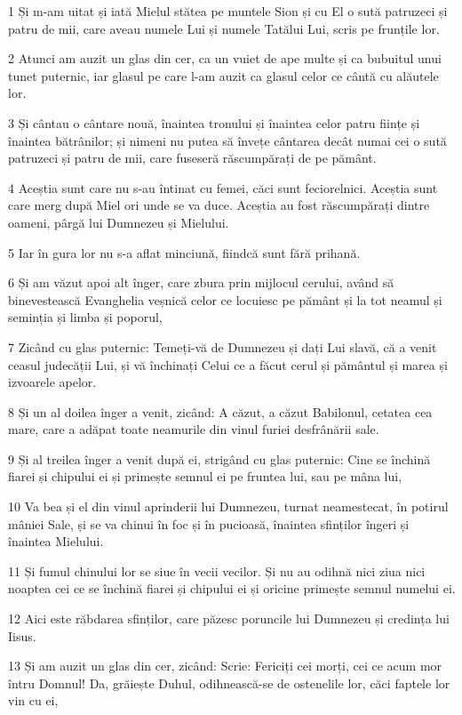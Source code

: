 \par 1 Și m-am uitat și iată Mielul stătea pe muntele Sion și cu El o sută patruzeci și patru de mii, care aveau numele Lui și numele Tatălui Lui, scris pe frunțile lor.
\par 2 Atunci am auzit un glas din cer, ca un vuiet de ape multe și ca bubuitul unui tunet puternic, iar glasul pe care l-am auzit ca glasul celor ce cântă cu alăutele lor.
\par 3 Și cântau o cântare nouă, înaintea tronului și înaintea celor patru ființe și înaintea bătrânilor; și nimeni nu putea să învețe cântarea decât numai cei o sută patruzeci și patru de mii, care fuseseră răscumpărați de pe pământ.
\par 4 Aceștia sunt care nu s-au întinat cu femei, căci sunt feciorelnici. Aceștia sunt care merg după Miel ori unde se va duce. Aceștia au fost răscumpărați dintre oameni, pârgă lui Dumnezeu și Mielului.
\par 5 Iar în gura lor nu s-a aflat minciună, fiindcă sunt fără prihană.
\par 6 Și am văzut apoi alt înger, care zbura prin mijlocul cerului, având să binevestească Evanghelia veșnică celor ce locuiesc pe pământ și la tot neamul și seminția și limba și poporul,
\par 7 Zicând cu glas puternic: Temeți-vă de Dumnezeu și dați Lui slavă, că a venit ceasul judecății Lui, și vă închinați Celui ce a făcut cerul și pământul și marea și izvoarele apelor.
\par 8 Și un al doilea înger a venit, zicând: A căzut, a căzut Babilonul, cetatea cea mare, care a adăpat toate neamurile din vinul furiei desfrânării sale.
\par 9 Și al treilea înger a venit după ei, strigând cu glas puternic: Cine se închină fiarei și chipului ei și primește semnul ei pe fruntea lui, sau pe mâna lui,
\par 10 Va bea și el din vinul aprinderii lui Dumnezeu, turnat neamestecat, în potirul mâniei Sale, și se va chinui în foc și în pucioasă, înaintea sfinților îngeri și înaintea Mielului.
\par 11 Și fumul chinului lor se siue în vecii vecilor. Și nu au odihnă nici ziua nici noaptea cei ce se închină fiarei și chipului ei și oricine primește semnul numelui ei.
\par 12 Aici este răbdarea sfinților, care păzesc poruncile lui Dumnezeu și credința lui Iisus.
\par 13 Și am auzit un glas din cer, zicând: Scrie: Fericiți cei morți, cei ce acum mor întru Domnul! Da, grăiește Duhul, odihnească-se de ostenelile lor, căci faptele lor vin cu ei,

